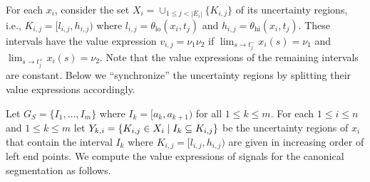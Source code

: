 For each $x_i$, consider the set $X_i = \cup_{1 \leq j < |E_i|} \{K_{i,j}\}$ of its uncertainty regions, i.e.,  $K_{i,j} = [l_{i,j}, h_{i,j})$ where $l_{i,j} = \theta_{\text{lo}}(x_i, t_j)$ and $h_{i,j} = \theta_{\text{hi}}(x_i, t_j)$.
These intervals have the value expression $v_{i,j} = \nu_1 \nu_2$ if $\lim_{s \to t_j^-} x_i(s) = \nu_1$ and $\lim_{s \to t_j^+} x_i(s) = \nu_2$.
Note that the value expressions of the remaining intervals are constant.
Below we ``synchronize'' the uncertainty regions by splitting their value expressions accordingly.

Let $G_S = \{I_1, \ldots, I_m\}$ where $I_k = [a_k, a_{k+1})$ for all $1 \leq k \leq m$.
For each $1 \leq i \leq n$ and $1 \leq k \leq m$ let $Y_{k,i} = \{ K_{i,j} \in X_i \st I_k \subseteq K_{i,j}\}$ be the uncertainty regions of $x_i$ that contain the interval $I_k$ where $K_{i,j} = [l_{i,j}, h_{i,j})$ are given in increasing order of left end points.
We compute the value expressions of signals for the canonical segmentation as follows. 
